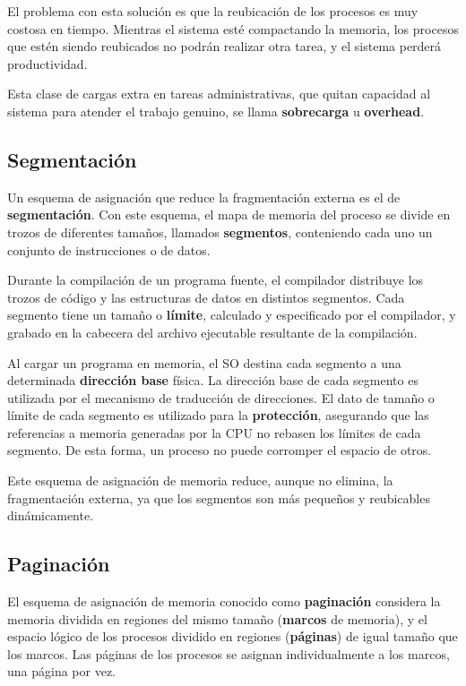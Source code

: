 \documentclass[spanish,a4paper,]{article}
\begin{document}
El problema con esta solución es que la reubicación de los procesos es
muy costosa en tiempo. Mientras el sistema esté compactando la memoria,
los procesos que estén siendo reubicados no podrán realizar otra tarea,
y el sistema perderá productividad.

Esta clase de cargas extra en tareas administrativas, que quitan
capacidad al sistema para atender el trabajo genuino, se llama
\textbf{sobrecarga} u \textbf{overhead}.

\hypertarget{segmentaciuxf3n}{%
\subsection{Segmentación}\label{segmentaciuxf3n}}

Un esquema de asignación que reduce la fragmentación externa es el de
\textbf{segmentación}. Con este esquema, el mapa de memoria del proceso
se divide en trozos de diferentes tamaños, llamados \textbf{segmentos},
conteniendo cada uno un conjunto de instrucciones o de datos.

Durante la compilación de un programa fuente, el compilador distribuye
los trozos de código y las estructuras de datos en distintos segmentos.
Cada segmento tiene un tamaño o \textbf{límite}, calculado y
especificado por el compilador, y grabado en la cabecera del archivo
ejecutable resultante de la compilación.

Al cargar un programa en memoria, el SO destina cada segmento a una
determinada \textbf{dirección base} física. La dirección base de cada
segmento es utilizada por el mecanismo de traducción de direcciones. El
dato de tamaño o límite de cada segmento es utilizado para la
\textbf{protección}, asegurando que las referencias a memoria generadas
por la CPU no rebasen los límites de cada segmento. De esta forma, un
proceso no puede corromper el espacio de otros.

Este esquema de asignación de memoria reduce, aunque no elimina, la
fragmentación externa, ya que los segmentos son más pequeños y
reubicables dinámicamente.

\hypertarget{paginaciuxf3n}{%
\subsection{Paginación}\label{paginaciuxf3n}}

El esquema de asignación de memoria conocido como \textbf{paginación}
considera la memoria dividida en regiones del mismo tamaño
(\textbf{marcos} de memoria), y el espacio lógico de los procesos
dividido en regiones (\textbf{páginas}) de igual tamaño que los marcos.
Las páginas de los procesos se asignan individualmente a los marcos, una
página por vez.
\end{document}
